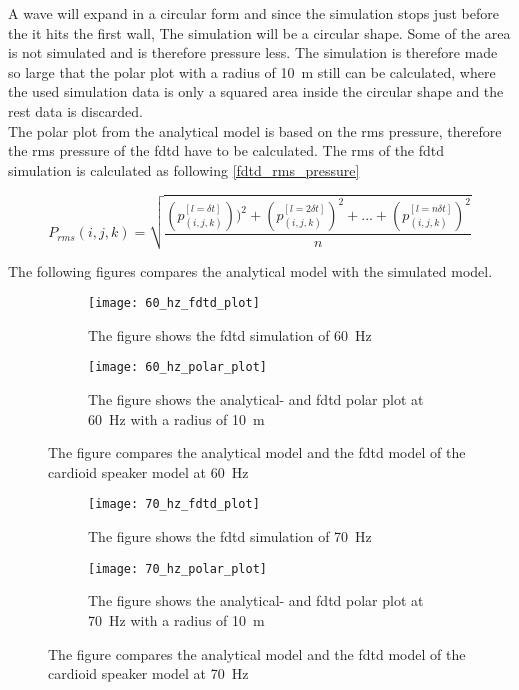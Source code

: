 A wave will expand in a circular form and since the simulation stops just before the it hits the first wall, The simulation will be a circular shape. Some of the area is not simulated and is therefore pressure less. The simulation is therefore made so large that the polar plot with a radius of \SI{10}{\meter} still can be calculated, where the used simulation data is only a squared area inside the circular shape and the rest data is discarded.\\

The polar plot from the analytical model is based on the \gls{rms} pressure, therefore the \gls{rms} pressure of the \gls{fdtd} have to be calculated. The \gls{rms} of the \gls{fdtd} simulation is calculated as following \autoref{fdtd_rms_pressure}

\begin{equation}\label{fdtd_rms_pressure}
P_{rms}(i,j,k)=\sqrt{\frac{\left(p_{(i,j,k)}^{[l= \delta t]} \right))^2 + \left(p_{(i,j,k)}^{[l= 2\delta t]}\right)^2 +...+\left(p_{(i,j,k)}^{[l= n\delta t]}\right)^2}{n}}
\end{equation}

 The following figures compares the analytical model with the simulated model. 

\begin{figure}[H]
\centering
\begin{subfigure}[htbp]{0.55\textwidth}
		\texttt{[image: 60\_hz\_fdtd\_plot]}
		\caption{The figure shows the \gls{fdtd} simulation of \SI{60}{\hertz}}
		\label{fig:fdtd_60_Hz}
\end{subfigure}
\begin{subfigure}[htbp]{0.35\textwidth}
		\texttt{[image: 60\_hz\_polar\_plot]}
		\caption{The figure shows the analytical- and \gls{fdtd} polar plot at \SI{60}{\hertz} with a radius of \SI{10}{\meter}}
		\label{fig:polar_60_Hz}
\end{subfigure} 
\caption{The figure compares the analytical model and the \gls{fdtd} model of the cardioid speaker model at \SI{60}{\hertz}}
\end{figure}


\begin{figure}[H]
\centering
\begin{subfigure}[htbp]{0.55\textwidth}
		\texttt{[image: 70\_hz\_fdtd\_plot]}
		\caption{The figure shows the \gls{fdtd} simulation of \SI{70}{\hertz}}
		\label{fig:fdtd_70_Hz}
\end{subfigure}
\begin{subfigure}[htbp]{0.35\textwidth}
		\texttt{[image: 70\_hz\_polar\_plot]}
		\caption{The figure shows the analytical- and \gls{fdtd} polar plot at \SI{70}{\hertz} with a radius of \SI{10}{\meter}}
		\label{fig:polar_70_Hz}
\end{subfigure} 
\caption{The figure compares the analytical model and the \gls{fdtd} model of the cardioid speaker model at \SI{70}{\hertz}}
\end{figure}



